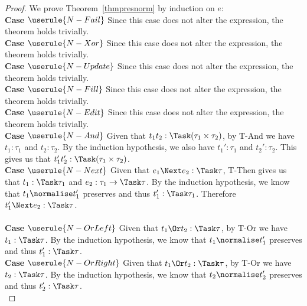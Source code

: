 \begin{proof}
  We prove Theorem~\ref{thmpresnorm} by induction on $e$:\\

  \noindent\textbf{Case} $\userule{N-Fail}$ Since this case does not alter the
  expression, the theorem holds trivially.\\

  \noindent\textbf{Case} $\userule{N-Xor}$ Since this case does not alter the
  expression, the theorem holds trivially.\\

  \noindent\textbf{Case} $\userule{N-Update}$ Since this case does not alter
  the expression, the theorem holds trivially.\\

  \noindent\textbf{Case} $\userule{N-Fill}$ Since this case does not alter the
  expression, the theorem holds trivially.\\

  \noindent\textbf{Case} $\userule{N-Edit}$ Since this case does not alter the
  expression, the theorem holds trivially.\\

  \noindent\textbf{Case} $\userule{N-And}$ Given that $t_1\And t_2:\Task(\tau_1\times\tau_2)$, by T-And we have $t_1:\tau_1$ and $t_2:\tau_2$. By the induction hypothesis, we also have $t_1':\tau_1$ and $t_2':\tau_2$. This gives us that $t_1'\And t_2':\Task(\tau_1\times\tau_2)$.\\

  \noindent\textbf{Case} $\userule{N-Next}$ Given that $e_1\Next e_2:\Task \tau$, T-Then gives us that $t_1:\Task\tau_1$
  and $e_2:\tau_1 \to \Task \tau$. By the induction hypothesis, we know that
  $t_1\normalise t_1'$ preserves and thus $t_1':\Task\tau_1$. Therefore
  $t_1'\Next e_2:\Task\tau$.\\\\

  \noindent\textbf{Case} $\userule{N-OrLeft}$ Given that $t_1\Or t_2:\Task\tau$,
  by T-Or we have $t_1:\Task\tau$. By the induction hypothesis, we know that
  $t_1\normalise t_1'$ preserves and thus $t_1':\Task\tau$.\\

  \noindent\textbf{Case} $\userule{N-OrRight}$ Given that $t_1\Or t_2:\Task\tau$,
  by T-Or we have $t_2:\Task\tau$. By the induction hypothesis, we know that
  $t_2\normalise t_2'$ preserves and thus $t_2':\Task\tau$. \\


\end{proof}
